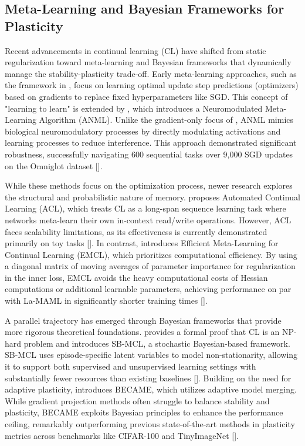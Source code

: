 \documentclass[11pt]{article}
\begin{document}
\subsection{Meta-Learning and Bayesian Frameworks for Plasticity}

Recent advancements in continual learning (CL) have shifted from static regularization toward meta-learning and Bayesian frameworks that dynamically manage the stability-plasticity trade-off. Early meta-learning approaches, such as the framework in \citep{1806.06928}, focus on learning optimal update step predictions (optimizers) based on gradients to replace fixed hyperparameters like SGD. This concept of "learning to learn" is extended by \citep{2002.09571}, which introduces a Neuromodulated Meta-Learning Algorithm (ANML). Unlike the gradient-only focus of \citep{1806.06928}, ANML mimics biological neuromodulatory processes by directly modulating activations and learning processes to reduce interference. This approach demonstrated significant robustness, successfully navigating 600 sequential tasks over 9,000 SGD updates on the Omniglot dataset [\citep{2002.09571}].

While these methods focus on the optimization process, newer research explores the structural and probabilistic nature of memory. \citep{2312.00276} proposes Automated Continual Learning (ACL), which treats CL as a long-span sequence learning task where networks meta-learn their own in-context read/write operations. However, ACL faces scalability limitations, as its effectiveness is currently demonstrated primarily on toy tasks [\citep{2312.00276}]. In contrast, \citep{2210.00713} introduces Efficient Meta-Learning for Continual Learning (EMCL), which prioritizes computational efficiency. By using a diagonal matrix of moving averages of parameter importance for regularization in the inner loss, EMCL avoids the heavy computational costs of Hessian computations or additional learnable parameters, achieving performance on par with La-MAML in significantly shorter training times [\citep{2210.00713}].

A parallel trajectory has emerged through Bayesian frameworks that provide more rigorous theoretical foundations. \citep{2405.18758} provides a formal proof that CL is an NP-hard problem and introduces SB-MCL, a stochastic Bayesian-based framework. SB-MCL uses episode-specific latent variables to model non-stationarity, allowing it to support both supervised and unsupervised learning settings with substantially fewer resources than existing baselines [\citep{2405.18758}]. Building on the need for adaptive plasticity, \citep{2504.02666} introduces BECAME, which utilizes adaptive model merging. While gradient projection methods often struggle to balance stability and plasticity, BECAME exploits Bayesian principles to enhance the performance ceiling, remarkably outperforming previous state-of-the-art methods in plasticity metrics across benchmarks like CIFAR-100 and TinyImageNet [\citep{2504.02666}].
\end{document}
